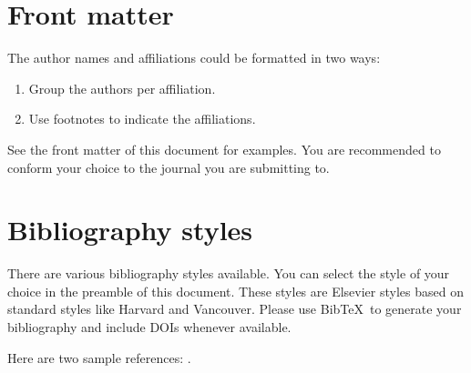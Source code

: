 \documentclass[review]{elsarticle}
\begin{document}
\section{Front matter}

The author names and affiliations could be formatted in two ways:
\begin{enumerate}[(1)]
\item Group the authors per affiliation.
\item Use footnotes to indicate the affiliations.
\end{enumerate}
See the front matter of this document for examples. You are recommended to conform your choice to the journal you are submitting to.

\section{Bibliography styles}

There are various bibliography styles available. You can select the style of your choice in the preamble of this document. These styles are Elsevier styles based on standard styles like Harvard and Vancouver. Please use Bib\TeX\ to generate your bibliography and include DOIs whenever available.

Here are two sample references: \cite{Feynman1963118,Dirac1953888}.



\end{document}
